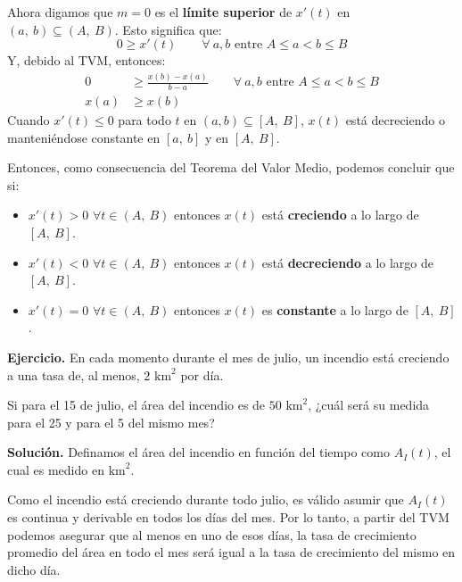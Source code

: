 \documentclass[12pt]{article}
\begin{document}
Ahora digamos que $m = 0$ es el \textbf{límite superior} de $x'(t)$ en $(a, \ b) \subseteq (A, \ B)$. Esto significa que:
\[
  0 \geq x'(t) \qquad \forall \ a, b \text{ entre } A \leq a < b \leq B
\]
Y, debido al TVM, entonces:
\begin{align*}
0 &\geq \frac{x(b) - x(a)}{b - a} \qquad \forall \ a, b \text{ entre } A \leq a < b \leq B \\
x(a) &\geq x(b)
\end{align*}
Cuando $x'(t) \leq 0$ para todo $t$ en $(a, b) \subseteq [A, \ B]$, $x(t)$ está decreciendo o manteniéndose constante en $[a, \ b]$ y en $[A, \ B]$.

Entonces, como consecuencia del Teorema del Valor Medio, podemos concluir que si:

\begin{itemize}
\item $x'(t) > 0$ $\forall t \in (A, \ B)$ entonces $x(t)$ está \textbf{creciendo} a lo largo de $[A, \ B]$.
\item $x'(t) < 0$  $\forall t \in (A, \ B)$ entonces $x(t)$ está \textbf{decreciendo} a lo largo de $[A, \ B]$.
\item $x'(t) = 0$  $\forall t \in (A, \ B)$ entonces $x(t)$ es \textbf{constante} a lo largo de $[A, \ B]$.
\end{itemize}

\textbf{Ejercicio.} \quad En cada momento durante el mes de julio, un incendio está creciendo a una tasa de, al menos, $2 \text{ km}^{2}$ por día.

Si para el 15 de julio, el área del incendio es de $50 \text{ km}^{2}$, ¿cuál será su medida para el 25 y para el 5 del mismo mes?

\textbf{Solución.} \quad Definamos el área del incendio en función del tiempo como $A_{I}(t)$, el cual es medido en $\text{km}^{2}$.

Como el incendio está creciendo durante todo julio, es válido asumir que $A_{I}(t)$ es continua y derivable en todos los días del mes. Por lo tanto, a partir del TVM podemos asegurar que al menos en uno de esos días, la tasa de crecimiento promedio del área en todo el mes será igual a la tasa de crecimiento del mismo en dicho día.

\end{document}

